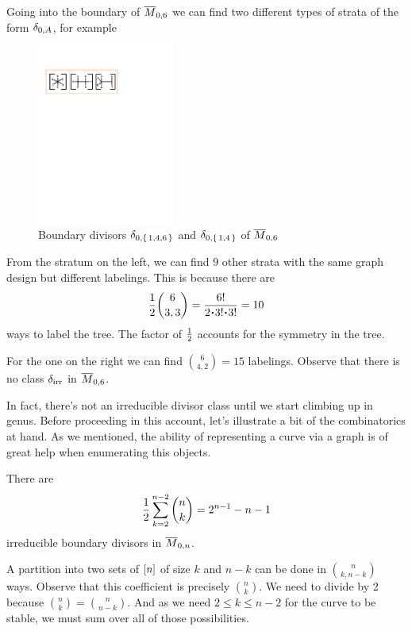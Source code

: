 \documentclass[12pt]{memoir}
\begin{document}
\begin{Ex}
    Going into the boundary of $\overline M_{0,6}$ we can find two different types of strata of the form $\delta_{0,A}$, for example
    \begin{figure}[h!]
        \centering
        \includegraphics[width=0.4\textwidth, trim= 5.12cm 20.75cm 8.93cm 3.9cm,clip]{../figs/FigsDNnotability.pdf}
        \caption{Boundary divisors $\delta_{0,\{\,1,4,6\,\}}$ and $\delta_{0,\{\,1,4\,\}}$ of $\overline{M}_{0,6}$}
        \label{fig:boundary-strata-M06c1}
    \end{figure} 
    From the stratum on the left, we can find $9$ other strata with the same graph design but different labelings. This is because there are 
    $$\half\binom{6}{3,3}=\frac{6!}{2\.3!\.3!}=10$$
    ways to label the tree. The factor of $\half$ accounts for the symmetry in the tree.\par
    For the one on the right we can find $\binom{6}{4,2}=15$ labelings. Observe that there is no class $\delta_{\text{irr}}$ in $\overline M_{0,6}$. 
\end{Ex}

In fact, there's not an irreducible divisor class until we start climbing up in genus. Before proceeding in this account, let's illustrate a bit of the combinatorics at hand. As we mentioned, the ability of representing a curve via a graph is of great help when enumerating this objects.

\begin{Prop}
    There are 
    $$\half\sum_{k=2}^{n-2}\binom{n}{k}=2^{n-1}-n-1$$
    irreducible boundary divisors in $\overline M_{0,n}$.
\end{Prop}

\begin{ptcbp}
    A partition into two sets of $\left\lbrack n\right\rbrack$ of size $k$ and $n-k$ can be done in $\binom{n}{k,n-k}$ ways. Observe that this coefficient is precisely $\binom{n}{k}$. We need to divide by 2 because $\binom{n}{k}=\binom{n}{n-k}$. And as we need $2\leq k\leq n-2$ for the curve to be stable, we must sum over all of those possibilities. 
\end{ptcbp}
\end{document}
